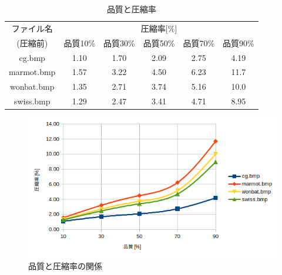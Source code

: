 \documentclass[uplatex, titlepage]{jsarticle}
\begin{document}
\begin{table}
  \centering
  \caption{品質と圧縮率}
  \label{table:hinsituiasyuku}
  \begin{tabular}{|c|c|c|c|c|c|} \hline
    ファイル名 & \multicolumn{5}{|c|}{圧縮率[\%]} \\ \cline{2-6}
    (圧縮前) & 品質10\% & 品質30\% & 品質50\% & 品質70\% & 品質90\% \\ \hline
    cg.bmp & 1.10 & 1.70 & 2.09 & 2.75 & 4.19  \\ \hline
    marmot.bmp & 1.57 & 3.22 & 4.50 & 6.23 & 11.7 \\ \hline
    wonbat.bmp & 1.35 & 2.71 & 3.74 & 5.16 & 10.0  \\ \hline
    swiss.bmp & 1.29 & 2.47 & 3.41 & 4.71 & 8.95  \\ \hline
  \end{tabular}
\end{table}

\begin{figure}[H]
  \centering
  \includegraphics[scale=0.6]{./grahh.png}
  \caption{品質と圧縮率の関係}
  \label{fig:hinsitu}
\end{figure}
\end{document}
